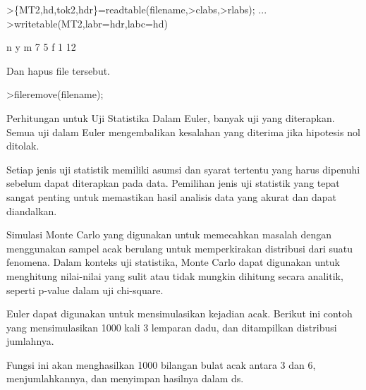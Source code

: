 \documentclass[a4paper,10pt]{article}
\begin{document}
\begin{eulernotebook}
\begin{eulercomment}
\begin{eulercomment}
\begin{eulercomment}
\begin{eulercomment}
\begin{eulercomment}
\begin{eulercomment}
\begin{eulercomment}
\begin{eulercomment}
\begin{eulercomment}
\begin{eulercomment}
\begin{eulercomment}
\begin{eulercomment}
\begin{eulercomment}
\begin{eulercomment}
\begin{eulercomment}
\begin{eulercomment}
\begin{eulerprompt}
>\{MT2,hd,tok2,hdr\}=readtable(filename,>clabs,>rlabs); ...
>writetable(MT2,labr=hdr,labc=hd)
\end{eulerprompt}
\begin{euleroutput}
                     n         y
           m         7         5
           f         1        12
\end{euleroutput}
\begin{eulercomment}
Dan hapus file tersebut.
\end{eulercomment}
\begin{eulerprompt}
>fileremove(filename);
\end{eulerprompt}
\begin{eulercomment}
\begin{eulercomment}
\begin{eulercomment}
Perhitungan untuk Uji Statistika Dalam Euler, banyak uji yang
diterapkan. Semua uji dalam Euler mengembalikan kesalahan yang
diterima jika hipotesis nol ditolak.

Setiap jenis uji statistik memiliki asumsi dan syarat tertentu yang
harus dipenuhi sebelum dapat diterapkan pada data. Pemilihan jenis uji
statistik yang tepat sangat penting untuk memastikan hasil analisis
data yang akurat dan dapat diandalkan.

\end{eulercomment}
\begin{eulercomment}
Simulasi Monte Carlo yang digunakan untuk memecahkan masalah dengan
menggunakan sampel acak berulang untuk memperkirakan distribusi dari
suatu fenomena. Dalam konteks uji statistika, Monte Carlo dapat
digunakan untuk menghitung nilai-nilai yang sulit atau tidak mungkin
dihitung secara analitik, seperti p-value dalam uji chi-square.

Euler dapat digunakan untuk mensimulasikan kejadian acak. Berikut ini
contoh yang mensimulasikan 1000 kali 3 lemparan dadu, dan ditampilkan
distribusi jumlahnya.

Fungsi ini akan menghasilkan 1000 bilangan bulat acak antara 3 dan 6,
menjumlahkannya, dan menyimpan hasilnya dalam ds.


\end{eulercomment}
\end{eulercomment}
\end{eulercomment}
\end{eulercomment}
\end{eulercomment}
\end{eulercomment}
\end{eulercomment}
\end{eulercomment}
\end{eulercomment}
\end{eulercomment}
\end{eulercomment}
\end{eulercomment}
\end{eulercomment}
\end{eulercomment}
\end{eulercomment}
\end{eulercomment}
\end{eulercomment}
\end{eulercomment}
\end{eulercomment}
\end{eulernotebook}
\end{document}
